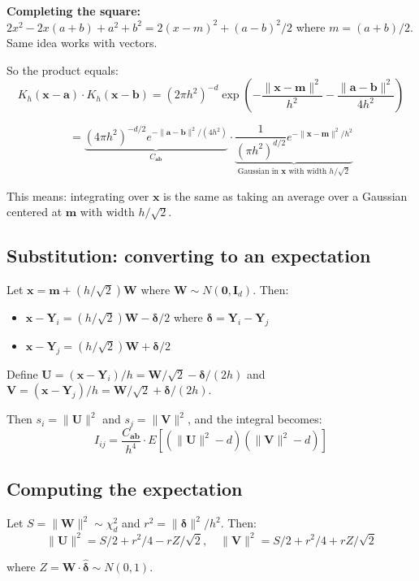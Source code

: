 \documentclass[12pt]{article}
\newcommand{\mathnote}[1]{\begin{tcolorbox}[colback=yellow!5,colframe=yellow!60!black,breakable]#1\end{tcolorbox}}
\begin{document}
\mathnote{
\textbf{Completing the square:} $2x^2 - 2x(a+b) + a^2+b^2 = 2(x-m)^2 + (a-b)^2/2$ where $m=(a+b)/2$. Same idea works with vectors.
}

So the product equals:
$$K_h(\mathbf{x}-\mathbf{a})\cdot K_h(\mathbf{x}-\mathbf{b}) = (2\pi h^2)^{-d}\exp\!\left(-\frac{\|\mathbf{x}-\mathbf{m}\|^2}{h^2} - \frac{\|\mathbf{a}-\mathbf{b}\|^2}{4h^2}\right)$$

$$= \underbrace{(4\pi h^2)^{-d/2}e^{-\|\mathbf{a}-\mathbf{b}\|^2/(4h^2)}}_{C_{\mathbf{ab}}}\cdot\underbrace{\frac{1}{(\pi h^2)^{d/2}}e^{-\|\mathbf{x}-\mathbf{m}\|^2/h^2}}_{\text{Gaussian in }\mathbf{x}\text{ with width }h/\sqrt{2}}$$

This means: integrating over $\mathbf{x}$ is the same as taking an average over a Gaussian centered at $\mathbf{m}$ with width $h/\sqrt{2}$.

\subsection{Substitution: converting to an expectation}

Let $\mathbf{x} = \mathbf{m} + (h/\sqrt{2})\mathbf{W}$ where $\mathbf{W} \sim N(\mathbf{0}, \mathbf{I}_d)$. Then:
\begin{itemize}
\item $\mathbf{x} - \mathbf{Y}_i = (h/\sqrt{2})\mathbf{W} - \bm\delta/2$ where $\bm\delta = \mathbf{Y}_i - \mathbf{Y}_j$
\item $\mathbf{x} - \mathbf{Y}_j = (h/\sqrt{2})\mathbf{W} + \bm\delta/2$
\end{itemize}

Define $\mathbf{U} = (\mathbf{x}-\mathbf{Y}_i)/h = \mathbf{W}/\sqrt{2} - \bm\delta/(2h)$ and $\mathbf{V} = (\mathbf{x}-\mathbf{Y}_j)/h = \mathbf{W}/\sqrt{2} + \bm\delta/(2h)$.

Then $s_i = \|\mathbf{U}\|^2$ and $s_j = \|\mathbf{V}\|^2$, and the integral becomes:
$$I_{ij} = \frac{C_{\mathbf{ab}}}{h^4}\cdot E\left[(\|\mathbf{U}\|^2 - d)(\|\mathbf{V}\|^2 - d)\right]$$

\subsection{Computing the expectation}

Let $S = \|\mathbf{W}\|^2 \sim \chi^2_d$ and $r^2 = \|\bm\delta\|^2/h^2$. Then:
$$\|\mathbf{U}\|^2 = S/2 + r^2/4 - rZ/\sqrt{2}, \quad \|\mathbf{V}\|^2 = S/2 + r^2/4 + rZ/\sqrt{2}$$

where $Z = \mathbf{W}\cdot\hat{\bm\delta} \sim N(0,1)$.
\end{document}
